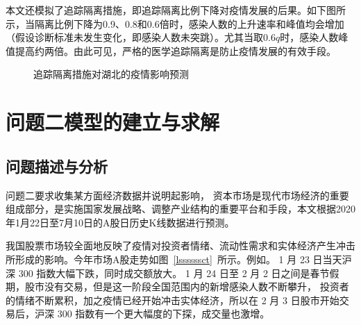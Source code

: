 \documentclass{whutmod}
\begin{document}
       本文还模拟了追踪隔离措施，即追踪隔离比例下降对疫情发展的后果。如下图所示，当隔离比例下降为0.9、0.8和0.6倍时，感染人数的上升速率和峰值均会增加（假设诊断标准未发生变化，即感染人数未突跳）。尤其当取$0.6q$时，感染人数峰值提高约两倍。由此可见，严格的医学追踪隔离是防止疫情发展的有效手段。
          \begin{figure}[H]
        	\centering
        	\caption{追踪隔离措施对湖北的疫情影响预测}
        \end{figure}
        
  
	\section{问题二模型的建立与求解}
		\subsection{问题描述与分析}
			问题二要求收集某方面经济数据并说明起影响， 资本市场是现代市场经济的重要组成部分，是实施国家发展战略、调整产业结构的重要平台和手段，本文根据2020年1月22日至7月10日的A股日历史K线数据进行预测。
			
			

    		我国股票市场较全面地反映了疫情对投资者情绪、流动性需求和实体经济产生冲击所形成的影响。今年市场A股走势如图~\ref{lssssssct}~所示。例如。 1 月 23 日当天沪深 300 指数大幅下跌，同时成交额放大。 1 月 24 日至 2 月 2 日之间是春节假期，股市没有交易，但是这一阶段全国范围内的新增感染人数不断攀升， 投资者的情绪不断累积，加之疫情已经开始冲击实体经济，所以在 2 月 3 日股市开始交易后，沪深 300 指数有一个更大幅度的下探，成交量也激增。
\end{document}
